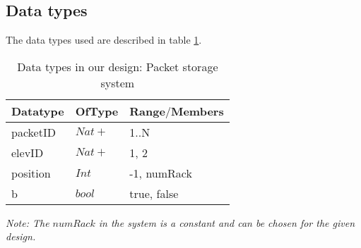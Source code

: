 \subsection*{Data types}
The data types used are described in table \ref{tab: data_types}.
\begin{table}[h]
\centering
\begin{tabular}{|l|l|l|}\hline
Datatype & OfType & Range$\slash$Members\\\hline
packetID & $Nat+$ & { 1..N} \\\hline
elevID & $Nat+$ & { 1, 2}\\\hline
position & $Int$ & {-1, numRack}\\\hline
b & $bool$ & {true, false} \\\hline
\end{tabular}
\caption{Data types in our design: Packet storage system }
\label{tab: data_types}
\end{table}

\textit{Note: The $numRack$ in the system is a constant and can be chosen for the given design.}
